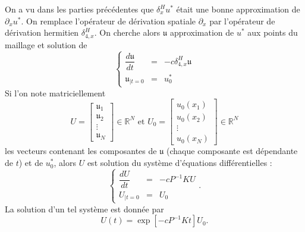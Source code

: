 On a vu dans les parties précédentes que $\delta_x^H u^*$ était une bonne approximation de $\partial_x u^*$. On remplace l'opérateur de dérivation spatiale $\partial_x$ par l'opérateur de dérivation hermitien $\delta_{4,x}^H$.
On cherche alors $\mathfrak{u}$ approximation de $u^*$ aux points du maillage et solution de 
\begin{equation}
\left\lbrace
\begin{array}{rcl}
\dfrac{d \mathfrak{u}}{dt} & = & - c \delta_{4,x}^H \mathfrak{u} \\
\mathfrak{u}_{|t=0} & = & u_0^*
\end{array}
\right.
\end{equation}
Si l'on note matriciellement 
\begin{equation}
U = \begin{bmatrix}
\mathfrak{u}_1 \\
\mathfrak{u}_2 \\
\vdots \\
\mathfrak{u}_N
\end{bmatrix} \in \mathbb{R}^N \text{ et } U_0 = \begin{bmatrix}
u_0(x_1) \\
u_0(x_2) \\
\vdots \\
u_0(x_N)
\end{bmatrix} \in \mathbb{R}^N
\end{equation}
les vecteurs contenant les composantes de $\mathfrak{u}$ (chaque composante est dépendante de $t$) et de $u_0^*$, alors $U$ est solution du système d'équations différentielles :
\begin{equation}
\left\lbrace
\begin{array}{rcl}
\dfrac{d U}{dt} & = & - c P^{-1}K U \\
U_{|t=0} & = & U_0
\end{array}
\right. .
\end{equation}
La solution d'un tel système est donnée par 
\begin{equation}
U(t) = \exp\left[ - c P^{-1}K t\right] U_0.
\end{equation}

